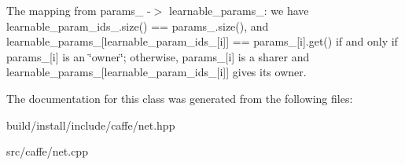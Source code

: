 The mapping from params\+\_\+ -\/$>$ learnable\+\_\+params\+\_\+\+: we have learnable\+\_\+param\+\_\+ids\+\_\+.\+size() == params\+\_\+.\+size(), and learnable\+\_\+params\+\_\+\mbox{[}learnable\+\_\+param\+\_\+ids\+\_\+\mbox{[}i\mbox{]}\mbox{]} == params\+\_\+\mbox{[}i\mbox{]}.get() if and only if params\+\_\+\mbox{[}i\mbox{]} is an \char`\"{}owner\char`\"{}; otherwise, params\+\_\+\mbox{[}i\mbox{]} is a sharer and learnable\+\_\+params\+\_\+\mbox{[}learnable\+\_\+param\+\_\+ids\+\_\+\mbox{[}i\mbox{]}\mbox{]} gives its owner. 

The documentation for this class was generated from the following files\+:\begin{DoxyCompactItemize}
\item 
build/install/include/caffe/net.\+hpp\item 
src/caffe/net.\+cpp\end{DoxyCompactItemize}
